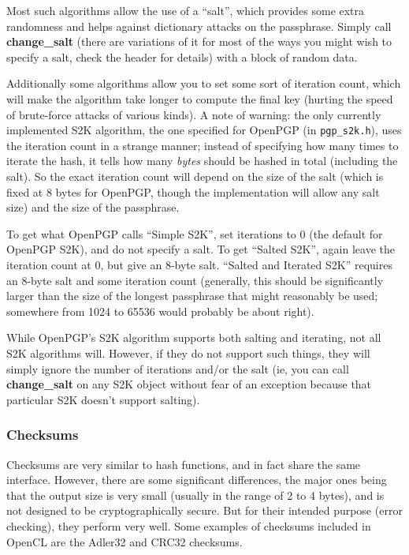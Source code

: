 \documentclass{article}
\newcommand{\filename}[1]{\texttt{#1}}
\newcommand{\function}[1]{\textbf{#1}}
\begin{document}
Most such algorithms allow the use of a ``salt'', which provides some extra
randomness and helps against dictionary attacks on the passphrase. Simply
call \function{change\_salt} (there are variations of it for most of the
ways you might wish to specify a salt, check the header for details) with
a block of random data.

Additionally some algorithms allow you to set some sort of iteration count,
which will make the algorithm take longer to compute the final key (hurting the
speed of brute-force attacks of various kinds). A note of warning: the only
currently implemented S2K algorithm, the one specified for OpenPGP (in
\filename{pgp\_s2k.h}), uses the iteration count in a strange manner; instead
of specifying how many times to iterate the hash, it tells how many
\emph{bytes} should be hashed in total (including the salt). So the exact
iteration count will depend on the size of the salt (which is fixed at 8 bytes
for OpenPGP, though the implementation will allow any salt size) and the size
of the passphrase.

To get what OpenPGP calls ``Simple S2K'', set iterations to 0 (the default for
OpenPGP S2K), and do not specify a salt. To get ``Salted S2K'', again leave the
iteration count at 0, but give an 8-byte salt. ``Salted and Iterated S2K''
requires an 8-byte salt and some iteration count (generally, this should be
significantly larger than the size of the longest passphrase that might
reasonably be used; somewhere from 1024 to 65536 would probably be about
right).

While OpenPGP's S2K algorithm supports both salting and iterating, not all
S2K algorithms will. However, if they do not support such things, they will
simply ignore the number of iterations and/or the salt (ie, you can call
\function{change\_salt} on any S2K object without fear of an exception because
that particular S2K doesn't support salting).

\subsubsection{Checksums}

Checksums are very similar to hash functions, and in fact share the same
interface. However, there are some significant differences, the major ones
being that the output size is very small (usually in the range of 2 to 4
bytes), and is not designed to be cryptographically secure. But for their
intended purpose (error checking), they perform very well. Some examples of
checksums included in OpenCL are the Adler32 and CRC32 checksums.
\end{document}
